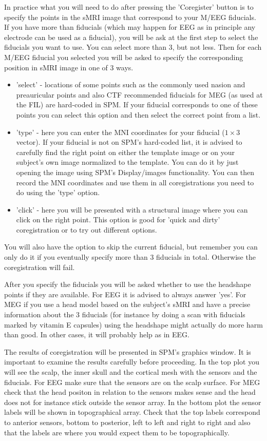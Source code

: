In practice what you will need to do after pressing  the 'Coregister' button is to specify the points
in the sMRI image that correspond to your M/EEG fiducials. If you have more than fiducials (which may happen
for EEG as in principle any electrode can be used as a fiducial), you will be ask at the first step to select
the fiducials you want to use. You can select more than 3, but not less. Then for each M/EEG fiducial you selected
you will be asked to specify the corresponding position in sMRI image in one of 3 ways. 

\begin{itemize}
\item 'select' - locations of some points such as the commonly used nasion and preauricular points and also
CTF recommended fiducials for MEG (as used at the FIL) are hard-coded in SPM. If your fiducial corresponds to one of these
points you can select this option and then select the correct point from a list.
\item 'type' - here you can enter the MNI coordinates for your fiducial ($1 \times 3$ vector). If your fiducial is not
on SPM's hard-coded list, it is advised to carefully find the right point on either the template image or
on your subject's own image normalized to the template. You can do it by just opening the image using SPM's
Display/images functionality. You can then record the MNI coordinates and use them in all coregistrations you
need to do using the 'type' option.
\item 'click' - here you will be presented with a structural image where you can click on the right point. 
This option is good for 'quick and dirty' coregistration or to try out different options. 
\end{itemize}

You will also have the option to skip the current fiducial, but remember you can only do it if you eventually
specify more than 3 fiducials in total. Otherwise the coregistration will fail. 

After you specify the fiducials you will be asked whether to use the headshape points if they are available. 
For EEG it is advised to always answer 'yes'. For MEG if you use a head model based on the subject's sMRI and have
a precise information about the 3 fiducials (for instance by doing a scan with fiducials marked by vitamin E capsules)
using the headshape might actually do more harm than good. In other cases, it will probably help as in EEG. 

The results of coregistration will be presented in SPM's graphics window. It is important to examine the results
carefully before proceeding. In the top plot you will see the scalp, the inner skull and the cortical mesh
with the sensors and the fiducials. For EEG make sure that the sensors are on the scalp surface. For MEG check
that the head positon in relation to the sensors makes sense and the head does not for instance stick outside
the sensor array. In the bottom plot the sensor labels will be shown in topographical array. Check that the top
labels correspond to anterior sensors, bottom to posterior, left to left and right to right and also that the labels
are where you would expect them to be topographically.   

